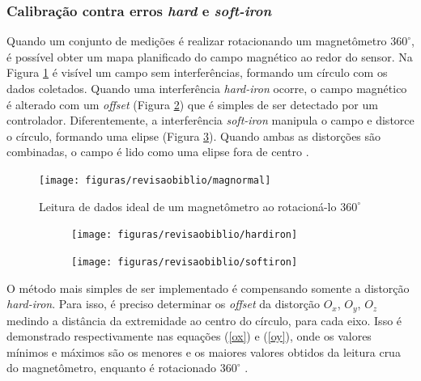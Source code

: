 \subsubsection{Calibração contra erros \textit{hard} e \textit{soft-iron}}

Quando um conjunto de medições é realizar rotacionando um magnetômetro $ 360^{\circ} $, é possível obter um mapa planificado do campo magnético ao redor do sensor. Na Figura \ref{fig:magnormal} é visível um campo sem interferências, formando um círculo com os dados coletados. Quando uma interferência \textit{hard-iron} ocorre, o campo magnético é alterado com um \textit{offset} (Figura \ref{fig:hardiron}) que é simples de ser detectado por um controlador. Diferentemente, a interferência \textit{soft-iron} manipula o campo e distorce o círculo, formando uma elipse (Figura \ref{fig:softiron}). Quando ambas as distorções são combinadas, o campo é lido como uma elipse fora de centro \cite{site:magFierce}. 


\begin{figure}[!htb]
	\centering
	\caption{Leitura de dados ideal de um magnetômetro ao rotacioná-lo  $ 360^{\circ} $}
	\texttt{[image: figuras/revisaobiblio/magnormal]}
	\label{fig:magnormal}
\end{figure}

\begin{figure}[!htb]
	\centering
	\captionsetup[subfigure]{justification=centering}
	\caption{Impacto das interferências \textit{hard-iron} (a) e  \textit{soft-iron} (b) na leitura do magnetômetro em rotação de $ 360^{\circ} $}
	\begin{subfigure}[b]{0.49\textwidth}
		\centering
		\texttt{[image: figuras/revisaobiblio/hardiron]}
		\caption{}
		\label{fig:hardiron}
	\end{subfigure}
	\hfill
	\begin{subfigure}[b]{0.49\textwidth}
		\centering
		\texttt{[image: figuras/revisaobiblio/softiron]}
		\caption{}
		\label{fig:softiron}
	\end{subfigure}
	\label{}
\end{figure}


O método mais simples de ser implementado é compensando somente a distorção \textit{hard-iron}. Para isso, é preciso determinar os \textit{offset} da distorção $O_x$, $O_y$, $O_z$ medindo a distância da extremidade ao centro do círculo, para cada eixo. Isso é demonstrado respectivamente nas equações (\ref{ox}) e (\ref{oy}), onde os valores mínimos e máximos são os menores e os maiores valores obtidos da leitura crua do magnetômetro, enquanto é rotacionado $ 360^{\circ} $ \cite{site:magFierce}.  

